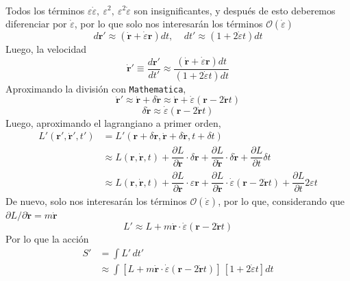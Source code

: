 \documentclass[]{article}
\numberwithin{equation}{section}
\newcommand{\0}{\textcolor{gray}{0}}
\newcommand{\rv}{\mathbf{r}}
\newcommand{\pd}[2]{\dfrac{\partial #1}{\partial #2}}
\newcommand{\lpd}[2]{\partial #1/\partial #2}
\begin{document}
\begin{enumerate}
\begin{align*}
	\end{align*}
	Todos los términos $\varepsilon \dot{\varepsilon}, ~ \varepsilon^2, ~ \varepsilon^2 \dot{\varepsilon}$ son insignificantes, y después de esto deberemos diferenciar por $\dot{\varepsilon}$, por lo que solo nos interesarán los términos $\mathcal{O}(\dot{\varepsilon})$
	\begin{equation*}
		d \rv' \approx \left(\dot{\rv} + \dot{\varepsilon} \rv\right) dt, ~~~~~ dt' \approx \left(1 + 2 \dot{\varepsilon} t\right) dt
	\end{equation*}
	Luego, la velocidad
	\begin{equation*}
		\dot{\rv}' \equiv \frac{d \rv'}{d t'} \approx \frac{\left(\dot{\rv} + \dot{\varepsilon} \rv \right) dt}{\left(1 + 2 \dot{\varepsilon} t\right) dt}
	\end{equation*}
	Aproximando la división con \texttt{Mathematica},
	\begin{equation*}
		\dot{\rv}' \approx \dot{\rv} + \delta \dot{\rv} \approx \dot{\rv} + \dot{\varepsilon}\left(\rv - 2 \dot{\rv} t\right)
	\end{equation*}
	\begin{equation*}
		\delta \dot{\rv} \approx \dot{\varepsilon}\left(\rv - 2 \dot{\rv} t\right)
	\end{equation*}
	Luego, aproximando el lagrangiano a primer orden,
	\begin{align*}
		L'(\rv',\dot{\rv}',t') &= L'(\rv + \delta \rv, \dot{\rv} + \delta \dot{\rv}, t + \delta t)\\
		&\approx L(\rv,\dot{\rv},t) + \pd{L}{\rv} \cdot \delta\rv + \pd{L}{\dot{\rv}} \cdot \delta\dot{\rv} + \pd{L}{t} \delta t\\
		&\approx L(\rv,\dot{\rv},t) + \pd{L}{\rv} \cdot \varepsilon \rv + \pd{L}{\dot{\rv}} \cdot \dot{\varepsilon}\left(\rv - 2 \dot{\rv} t\right) + \pd{L}{t} 2 \varepsilon t
	\end{align*}
	De nuevo, solo nos interesarán los términos $\mathcal{O}(\dot{\varepsilon})$, por lo que, considerando que $\lpd{L}{\dot{\rv}} = m \dot{\rv}$
	\begin{equation*}
		L' \approx L + m \dot{\rv} \cdot \dot{\varepsilon}\left(\rv - 2 \dot{\rv} t\right) 
	\end{equation*}
	Por lo que la acción
	\begin{align*}
		S' &= \int L' \, dt'\\
		&\approx \int \left[L + m \dot{\rv} \cdot \dot{\varepsilon}\left(\rv - 2 \dot{\rv} t\right)\right] \, \left[1 + 2 \dot{\varepsilon} t\right] dt\\

\end{align*}
\end{enumerate}
\end{document}
